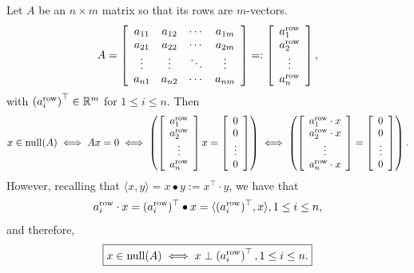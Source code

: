 \begin{tcolorbox}[title=\textbf{Null Space of $A$ Consists of Vectors Orthogonal to the Rows of $A$}]

Let $A$ be an $n \times m$ matrix so that its rows are $m$-vectors.
$$A=\left[\begin{array}{cccc} a_{11}& a_{12}& \cdots & a_{1m} \\
 a_{21}& a_{22}& \cdots & a_{2m}  \\
 \vdots & \vdots&  \ddots & \vdots \\
 a_{n1}& a_{n2}& \cdots & a_{nm} 
 \end{array}\right] =: \left[\begin{array}{c} a^{\rm row}_1 \\ a^{\rm row}_2 \\ \vdots \\ a^{\rm row}_n \end{array}\right],$$
 with $ \left(a^{\rm row}_i \right)^\top \in \mathbb R^m$ for $1 \le i \le n$. Then
 $$ x \in \mathrm{null}(A) \iff A x = 0 \iff  \left( \left[\begin{array}{c} a^{\rm row}_1 \\ a^{\rm row}_2 \\ \vdots \\ a^{\rm row}_n \end{array}\right] x =  \left[\begin{array}{c} 0 \\ 0 \\ \vdots \\ 0\end{array}\right] \right) \iff  \left( \left[\begin{array}{c} a^{\rm row}_1 \cdot x \\ a^{\rm row}_2 \cdot x \\ \vdots \\ a^{\rm row}_n \cdot x\end{array}\right] =  \left[\begin{array}{c} 0 \\ 0 \\ \vdots \\ 0\end{array}\right] \right). $$
 However, recalling that $\langle x, y \rangle = x \bullet y := x^\top \cdot y$, we have that
 $$a^{\rm row}_i \cdot x = (a^{\rm row}_i)^\top \bullet x = \langle (a^{\rm row}_i)^\top, x \rangle,  1 \le i \le n,$$
 and therefore, 
 $$\boxed{ x \in \mathrm{null}(A) \iff x \perp \left(a^{\rm row}_i \right)^\top, 1 \le i \le n. } $$
  
\end{tcolorbox}

